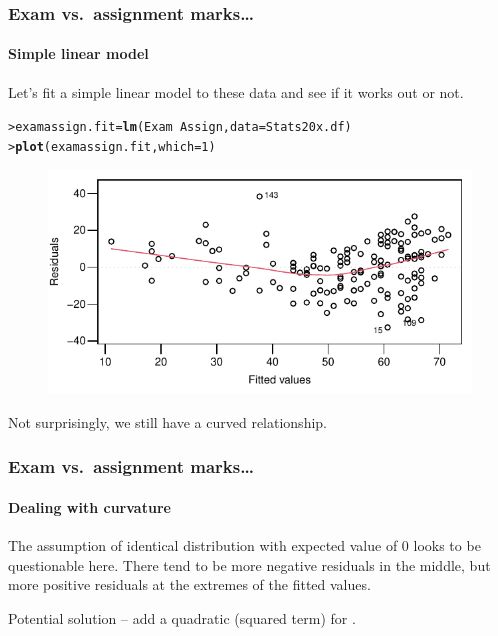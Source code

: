 \documentclass{beamer}\usepackage[]{graphicx}\usepackage[]{xcolor}
\makeatletter
\newcommand{\hlnum}[1]{\textcolor[rgb]{0.686,0.059,0.569}{#1}}%
\newcommand{\hlopt}[1]{\textcolor[rgb]{0,0,0}{#1}}%
\newcommand{\hlstd}[1]{\textcolor[rgb]{0.345,0.345,0.345}{#1}}%
\newcommand{\hlkwb}[1]{\textcolor[rgb]{0.69,0.353,0.396}{#1}}%
\newcommand{\hlkwc}[1]{\textcolor[rgb]{0.333,0.667,0.333}{#1}}%
\newcommand{\hlkwd}[1]{\textcolor[rgb]{0.737,0.353,0.396}{\textbf{#1}}}%
\newenvironment{kframe}{%
 \def\at@end@of@kframe{}%
 \ifinner\ifhmode%
  \def\at@end@of@kframe{\end{minipage}}%
  \begin{minipage}{\columnwidth}%
 \fi\fi%
 \def\FrameCommand##1{\hskip\@totalleftmargin \hskip-\fboxsep
 \colorbox{shadecolor}{##1}\hskip-\fboxsep
     \hskip-\linewidth \hskip-\@totalleftmargin \hskip\columnwidth}%
 \MakeFramed {\advance\hsize-\width
   \@totalleftmargin\z@ \linewidth\hsize
   \@setminipage}}%
 {\par\unskip\endMakeFramed%
 \at@end@of@kframe}
\newenvironment{knitrout}{}{} %
\makeatother
\begin{document}
\begin{frame}[fragile]
\frametitle{Exam vs.\ assignment marks\ldots}
\framesubtitle{Simple linear model}
Let's fit a simple linear model to these data and see if it works out or not.
\begin{knitrout}\scriptsize
{}\color{fgcolor}\begin{kframe}
\begin{alltt}
\hlstd{> }\hlstd{examassign.fit}\hlkwb{=}\hlkwd{lm}\hlstd{(Exam}\hlopt{~} \hlstd{Assign,}\hlkwc{data} \hlstd{= Stats20x.df)}
\hlstd{> }\hlkwd{plot}\hlstd{(examassign.fit,}\hlkwc{which}\hlstd{=}\hlnum{1}\hlstd{)}
\end{alltt}
\end{kframe}
\end{knitrout}




\begin{figure}
  \centering
  \includegraphics{figure/RC-H04-008}
\end{figure}

Not surprisingly, we still have a curved relationship.
\end{frame}


\begin{frame}[fragile]
\frametitle{Exam vs.\ assignment marks\ldots}
\framesubtitle{Dealing with curvature}
The assumption of identical distribution with expected value of 0 looks to be questionable here.
There tend to be more negative residuals in the middle, but more positive residuals at the extremes of the fitted values.

\bigskip

Potential solution -- add a quadratic (squared term) for .
\end{frame}
\end{document}
